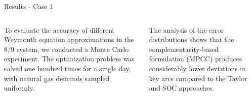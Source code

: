 \documentclass[hyperref={colorlinks,citecolor=blue,linkcolor=blue,urlcolor=blue}]{beamer}
\newlength\figureheight
\newlength\figurewidth
\begin{document}
\begin{frame}{Results - Case 1}
\scriptsize
\begin{columns}[t,onlytextwidth]
    \begin{column}{0.48\textwidth}
        \justifying
        To evaluate the accuracy of different Weymouth equation approximations in the 8/9 system, we conducted a Monte Carlo experiment. The optimization problem was solved one hundred times for a single day, with natural gas demands sampled uniformly.          
        \vspace{0.5em}
        \begin{figure}[!htb]
            \centering
            \setlength{}        
            \setlength{}
            
            \label{fig:blue_test_cost}
\end{figure}
    \end{column}
    
    \begin{column}{0.48\textwidth}
        \justifying
        The analysis of the error distributions shows that the complementarity-based formulation (MPCC) produces considerably lower deviations in key arcs compared to the Taylor and SOC approaches.
        \vspace{2.5em}
        \begin{figure}[!htb]
            \centering
            \setlength{}        
            \setlength{}
            
            \label{fig:blue_test_boxplot}
        \end{figure}
    \end{column}
\end{columns}
\end{frame}
\end{document}

